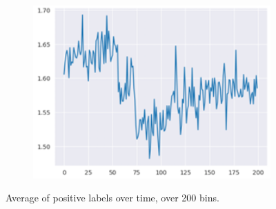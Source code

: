 \begin{figure}
    \centering
    \begin{subfigure}{0.5\columnwidth}
        \includegraphics[width=1\textwidth]{images/av_pos.png}
    \end{subfigure}
    \caption{Average of positive labels over time, over 200 bins.}
    \label{fig:av_pos}
\end{figure}
